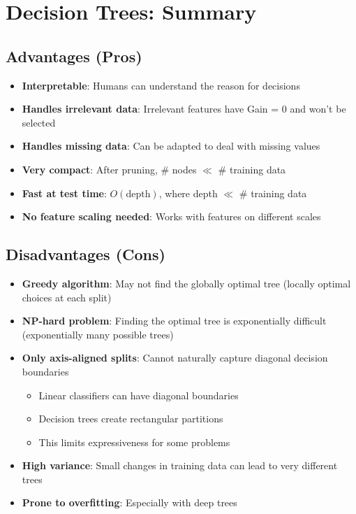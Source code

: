 \documentclass[11pt,a4paper]{article}
\theoremstyle{definition}
\theoremstyle{plain}
\theoremstyle{remark}
\begin{document}
\section{Decision Trees: Summary}

\subsection{Advantages (Pros)}

\begin{itemize}
    \item \textbf{Interpretable}: Humans can understand the reason for decisions
    \item \textbf{Handles irrelevant data}: Irrelevant features have Gain = 0 and won't be selected
    \item \textbf{Handles missing data}: Can be adapted to deal with missing values
    \item \textbf{Very compact}: After pruning, \# nodes \(\ll\) \# training data
    \item \textbf{Fast at test time}: \(O(\text{depth})\), where depth \(\ll\) \# training data
    \item \textbf{No feature scaling needed}: Works with features on different scales
\end{itemize}

\subsection{Disadvantages (Cons)}

\begin{itemize}
    \item \textbf{Greedy algorithm}: May not find the globally optimal tree (locally optimal choices at each split)
    
    \item \textbf{NP-hard problem}: Finding the optimal tree is exponentially difficult (exponentially many possible trees)
    
    \item \textbf{Only axis-aligned splits}: Cannot naturally capture diagonal decision boundaries
    \begin{itemize}
        \item Linear classifiers can have diagonal boundaries
        \item Decision trees create rectangular partitions
        \item This limits expressiveness for some problems
    \end{itemize}
    
    \item \textbf{High variance}: Small changes in training data can lead to very different trees
    
    \item \textbf{Prone to overfitting}: Especially with deep trees
\end{itemize}
\end{document}
